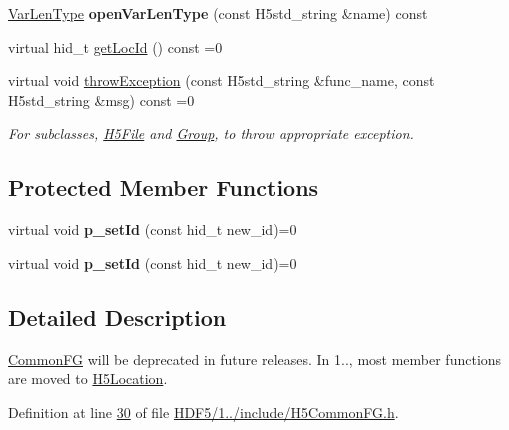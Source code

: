 \begin{DoxyCompactItemize}
\hyperlink{class_h5_1_1_var_len_type}{Var\+Len\+Type} {\bfseries open\+Var\+Len\+Type} (const H5std\+\_\+string \&name) const
\item 
virtual hid\+\_\+t \hyperlink{class_h5_1_1_common_f_g_a28dd053d0fa4ebad7fca2949e65d1987}{get\+Loc\+Id} () const =0
\item 
\mbox{\label{class_h5_1_1_common_f_g_a4cb5086fb31b5b5befb933a963720e81}} 
virtual void \hyperlink{class_h5_1_1_common_f_g_a4cb5086fb31b5b5befb933a963720e81}{throw\+Exception} (const H5std\+\_\+string \&func\+\_\+name, const H5std\+\_\+string \&msg) const =0
\begin{DoxyCompactList}\small\item\em For subclasses, \hyperlink{class_h5_1_1_h5_file}{H5\+File} and \hyperlink{class_h5_1_1_group}{Group}, to throw appropriate exception. \end{DoxyCompactList}\end{DoxyCompactItemize}
\subsection*{Protected Member Functions}
\begin{DoxyCompactItemize}
\item 
\mbox{\label{class_h5_1_1_common_f_g_ac1e7ca0b246f78cdae9486aefab0a6dc}} 
virtual void {\bfseries p\+\_\+set\+Id} (const hid\+\_\+t new\+\_\+id)=0
\item 
\mbox{\label{class_h5_1_1_common_f_g_ac1e7ca0b246f78cdae9486aefab0a6dc}} 
virtual void {\bfseries p\+\_\+set\+Id} (const hid\+\_\+t new\+\_\+id)=0
\end{DoxyCompactItemize}


\subsection{Detailed Description}
\hyperlink{class_h5_1_1_common_f_g}{Common\+FG} will be deprecated in future releases. In 1.., most member functions are moved to \hyperlink{class_h5_1_1_h5_location}{H5\+Location}. 

Definition at line \hyperlink{_h_d_f5_21_810_81_2include_2_h5_common_f_g_8h_source_l00030}{30} of file \hyperlink{_h_d_f5_21_810_81_2include_2_h5_common_f_g_8h_source}{H\+D\+F5/1../include/\+H5\+Common\+F\+G.\+h}.



